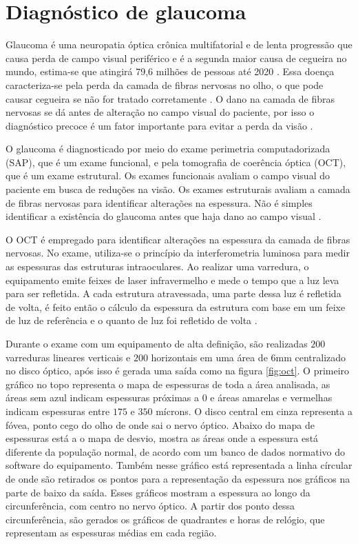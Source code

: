 \documentclass[conference]{IEEEtran}
\begin{document}
\section{Diagnóstico de glaucoma}


Glaucoma é uma neuropatia óptica crônica multifatorial e de lenta progressão que causa perda de campo visual periférico e é a segunda maior causa de cegueira no mundo, estima-se que atingirá 79,6 milhões de pessoas até 2020 \cite{Quigley2006}. Essa doença caracteriza-se pela perda da camada de fibras nervosas no olho, o que pode causar cegueira se não for tratado corretamente \cite{Quigley2011}. O dano na camada de fibras nervosas se dá antes de alteração no campo visual do paciente, por isso o diagnóstico precoce é um fator importante para evitar a perda da visão \cite{Malik2012}.

O glaucoma é diagnosticado por meio do exame perimetria computadorizada (SAP), que é um exame funcional, e pela tomografia de coerência óptica (OCT), que é um exame estrutural. Os exames funcionais avaliam o campo visual do paciente em busca de reduções na visão. Os exames estruturais avaliam a camada de fibras nervosas para identificar alterações na espessura. Não é simples identificar a existência do glaucoma antes que haja dano ao campo visual \cite{Populacoes2009}.

O OCT é empregado para identificar alterações na espessura da camada de fibras nervosas. No exame, utiliza-se o princípio da interferometria luminosa para medir as espessuras das estruturas intraoculares. Ao realizar uma varredura, o equipamento emite feixes de laser infravermelho e mede o tempo que a luz leva para ser refletida. A cada estrutura atravessada, uma parte dessa luz é refletida de volta, é feito então o cálculo da espessura da estrutura com base em um feixe de luz de referência e o quanto de luz foi refletido de volta \cite{huang1991}. 

Durante o exame com um equipamento de alta definição, são realizadas $200$ varreduras lineares verticais e $200$ horizontais em uma área de 6mm centralizado no disco óptico, após isso é gerada uma saída como na figura \ref{fig:oct}. O primeiro gráfico no topo representa o mapa de espessuras de toda a área analisada, as áreas sem azul indicam espessuras próximas a $0$ e áreas amarelas e vermelhas indicam espessuras entre $175$ e $350$ mícrons. O disco central em cinza representa a fóvea, ponto cego do olho de onde sai o nervo óptico. Abaixo do mapa de espessuras está a o mapa de desvio, mostra as áreas onde a espessura está diferente da população normal, de acordo com um banco de dados normativo do software do equipamento. Também nesse gráfico está representada a linha círcular de onde são retirados os pontos para a representação da espessura nos gráficos na parte de baixo da saída. Esses gráficos mostram a espessura ao longo da circunferência, com centro no nervo óptico. A partir dos ponto dessa circunferência, são gerados os gráficos de quadrantes e horas de relógio, que representam as espessuras médias em cada região.
\end{document}
